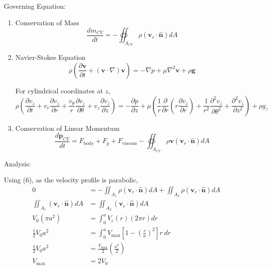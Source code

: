 \documentclass[10pt]{article}
\begin{document}
Governing Equation:
\begin{enumerate}
    \item Conservation of Mass
    \begin{equation}
        \frac{d m_{CV}}{dt} = -\oiint_{A_{CV}} \rho\left(\mathbf{v}_r \cdot \mathbf{\hat{n}}\right) dA
    \end{equation}

    \item Navier-Stokes Equation
    \begin{equation}
        \rho\left(\frac{\partial \mathbf{v}}{\partial t} + \left(\mathbf{v} \cdot \nabla\right) \mathbf{v}\right) = -\nabla p + \mu \nabla^2 \mathbf{v} + \rho\mathbf{g}
    \end{equation}

    For cylindrical coordinates at $z$,
    \begin{equation}
        \rho\left(\frac{\partial v_z}{\partial t} + v_r \frac{\partial v_z}{\partial r} + \frac{v_\theta}{r} \frac{\partial v_z}{\partial \theta} + v_z \frac{\partial v_z}{\partial z}\right) = -\frac{\partial p}{\partial z} + \mu \left(\frac{1}{r} \frac{\partial}{\partial r} \left(r \frac{\partial v_z}{\partial r}\right) + \frac{1}{r^2} \frac{\partial^2 v_z}{\partial \theta^2} + \frac{\partial^2 v_z}{\partial z^2}\right) + \rho g_z
    \end{equation}

    \item Conservation of Linear Momentum
    \begin{equation}
        \frac{d \mathbf{p}_{CV}}{dt} = F_{\textrm{body}} + F_{p} + F_{\textrm{viscous}} -\oiint_{A_{CV}} \rho \mathbf{v}\left(\mathbf{v}_r \cdot \mathbf{\hat{n}}\right) dA
    \end{equation}
\end{enumerate}

\hfill

Analysis:

Using (6), as the velocity profile is parabolic,
\begin{align*}
    0 &= -\iint_{A_{1}} \rho\left(\mathbf{v}_r \cdot \mathbf{\hat{n}}\right) dA +\iint_{A_{2}} \rho\left(\mathbf{v}_r \cdot \mathbf{\hat{n}}\right) dA \\
    \iint_{A_{1}} \left(\mathbf{v}_r \cdot \mathbf{\hat{n}}\right) dA &= \iint_{A_{2}} \left(\mathbf{v}_r \cdot \mathbf{\hat{n}}\right) dA \\
    V_0 \left(\pi a^2\right) &= \int_{0}^{a} V_e (r) \left(2\pi r\right) dr  \\
    \frac{1}{2} V_0 a^2 &= \int_{0}^{a} V_{\textrm{max}} \left[1 - \left(\frac{r}{a}\right)^2\right] r\ dr \\
    \frac{1}{2} V_0 a^2 &= \frac{V_{\textrm{max}}}{2} \left(\frac{a^2}{2}\right) \\
    V_{\textrm{max}} &= 2V_0
\end{align*}
\end{document}
